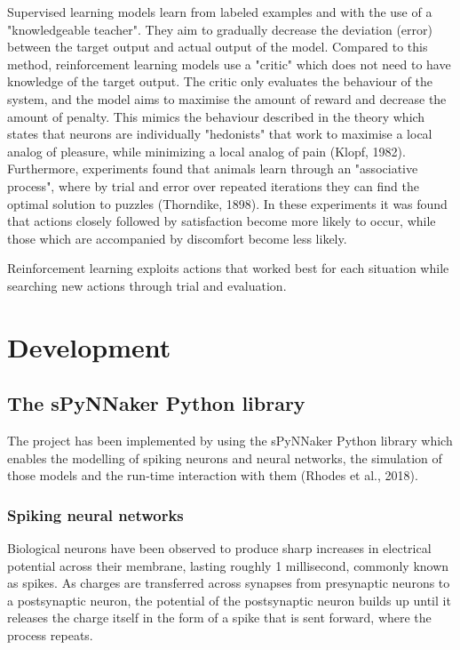 \documentclass[10pt]{article}
\begin{document}
    Supervised learning models learn from labeled examples and with the use of a "knowledgeable teacher". They aim to gradually decrease the deviation (error) between the target output and actual output of the model. Compared to this method, reinforcement learning models use a "critic" which does not need to have knowledge of the target output. The critic only evaluates the behaviour of the system, and the model aims to maximise the amount of reward and decrease the amount of penalty. This mimics the behaviour described in the theory which states that neurons are individually "hedonists" that work to maximise a local analog of pleasure, while minimizing a local analog of pain (Klopf, 1982). Furthermore, experiments found that animals learn through an "associative process", where by trial and error over repeated iterations they can find the optimal solution to puzzles (Thorndike, 1898). In these experiments it was found that actions closely followed by satisfaction become more likely to occur, while those which are accompanied by discomfort become less likely.

    Reinforcement learning exploits actions that worked best for each situation while searching new actions through trial and evaluation.
    
    \section{Development}

    \subsection{The sPyNNaker Python library}

    The project has been implemented by using the sPyNNaker Python library which enables the modelling of spiking neurons and neural networks, the simulation of those models and the run-time interaction with them (Rhodes et al., 2018).

    \subsubsection{Spiking neural networks}

    Biological neurons have been observed to produce sharp increases in electrical potential across their membrane, lasting roughly 1 millisecond, commonly known as spikes. As charges are transferred across synapses from presynaptic neurons to a postsynaptic neuron, the potential of the postsynaptic neuron builds up until it releases the charge itself in the form of a spike that is sent forward, where the process repeats.
\end{document}
